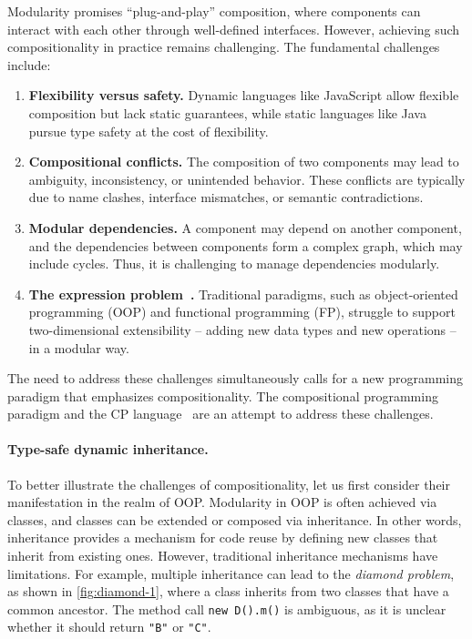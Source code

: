 Modularity promises ``plug-and-play'' composition, where components can interact
with each other through well-defined interfaces. However, achieving such
compositionality in practice remains challenging. The fundamental challenges
include:

\begin{enumerate}
\item \textbf{Flexibility versus safety.} Dynamic languages like JavaScript
      allow flexible composition but lack static guarantees, while static
      languages like Java pursue type safety at the cost of flexibility.
\item \textbf{Compositional conflicts.} The composition of two components may
      lead to ambiguity, inconsistency, or unintended behavior. These conflicts
      are typically due to name clashes, interface mismatches, or semantic
      contradictions.
\item \textbf{Modular dependencies.} A component may depend on another
      component, and the dependencies between components form a complex graph,
      which may include cycles. Thus, it is challenging to manage dependencies
      modularly.
\item \textbf{The expression problem~\textnormal{\citep{wadler1998expression}}.}
      Traditional paradigms, such as object-oriented programming (OOP) and
      functional programming (FP), struggle to support two-dimensional extensibility
      -- adding new data types and new operations -- in a modular way.
\end{enumerate}
The need to address these challenges simultaneously calls for a new programming
paradigm that emphasizes compositionality. The compositional programming
paradigm and the CP language~\citep{zhang2021compositional} are an attempt to
address these challenges.

\paragraph{Type-safe dynamic inheritance.}
To better illustrate the challenges of compositionality, let us first consider
their manifestation in the realm of OOP. Modularity in OOP is often achieved via
classes, and classes can be extended or composed via inheritance. In other
words, inheritance provides a mechanism for code reuse by defining new classes
that inherit from existing ones. However, traditional inheritance mechanisms
have limitations. For example, multiple inheritance can lead to the
\emph{diamond problem}, as shown in \autoref{fig:diamond-1}, where a class
inherits from two classes that have a common ancestor. The method call
\lstinline{new D().m()} is ambiguous, as it is unclear whether it should return
\lstinline{"B"} or \lstinline{"C"}.

